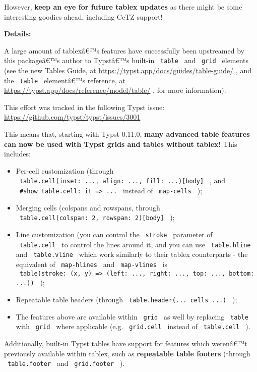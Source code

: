 However, \textbf{keep an eye for future tablex updates} as there might
be some interesting goodies ahead, including CeTZ support!

\textbf{Details:}

A large amount of tablexâ€™s features have successfully been upstreamed
by this packageâ€™s author to Typstâ€™s built-in \texttt{\ table\ } and
\texttt{\ grid\ } elements (see the new Tables Guide, at
\url{https://typst.app/docs/guides/table-guide/} , and the
\texttt{\ table\ } elementâ€™s reference, at
\url{https://typst.app/docs/reference/model/table/} , for more
information).

This effort was tracked in the following Typst issue:
\url{https://github.com/typst/typst/issues/3001}

This means that, starting with Typst 0.11.0, \textbf{many advanced table
features can now be used with Typst grids and tables without tablex!}
This includes:

\begin{itemize}
\tightlist
\item
  Per-cell customization (through
  \texttt{\ table.cell(inset:\ ...,\ align:\ ...,\ fill:\ ...){[}body{]}\ }
  , and \texttt{\ \#show\ table.cell:\ it\ =\textgreater{}\ ...\ }
  instead of \texttt{\ map-cells\ } );
\item
  Merging cells (colspans and rowspans, through
  \texttt{\ table.cell(colspan:\ 2,\ rowspan:\ 2){[}body{]}\ } );
\item
  Line customization (you can control the \texttt{\ stroke\ } parameter
  of \texttt{\ table.cell\ } to control the lines around it, and you can
  use \texttt{\ table.hline\ } and \texttt{\ table.vline\ } which work
  similarly to their tablex counterparts - the equivalent of
  \texttt{\ map-hlines\ } and \texttt{\ map-vlines\ } is
  \texttt{\ table(stroke:\ (x,\ y)\ =\textgreater{}\ (left:\ ...,\ right:\ ...,\ top:\ ...,\ bottom:\ ...))\ }
  );
\item
  Repeatable table headers (through
  \texttt{\ table.header(...\ cells\ ...)\ } );
\item
  The features above are available within \texttt{\ grid\ } as well by
  replacing \texttt{\ table\ } with \texttt{\ grid\ } where applicable
  (e.g. \texttt{\ grid.cell\ } instead of \texttt{\ table.cell\ } ).
\end{itemize}

Additionally, built-in Typst tables have support for features which
werenâ€™t previously available within tablex, such as \textbf{repeatable
table footers} (through \texttt{\ table.footer\ } and
\texttt{\ grid.footer\ } ).

